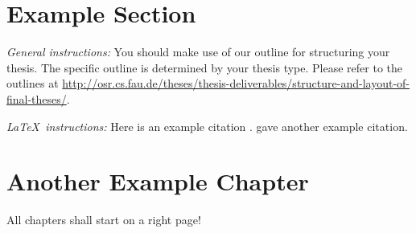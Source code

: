 \chapter{Example Section}
\label{chapter:example}

{\textsl{General instructions:}} 
You should make use of our outline for structuring your
thesis. The specific outline is determined by your thesis type.
Please refer to the outlines at 
\url{http://osr.cs.fau.de/theses/thesis-deliverables/structure-and-layout-of-final-theses/}.

{\textsl{\LaTeX\ instructions:}} Here is an example citation
\autocite{riehle:2011:controlling}.
\textcite{riehle:2007:economic} gave another example citation.


\chapter{Another Example Chapter}
\label{cahpter:another-example}

All chapters shall start on a right page!